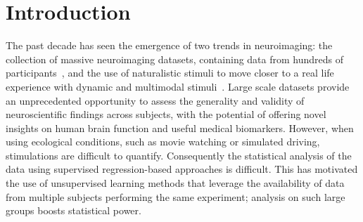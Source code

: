 %
\section{Introduction}
\label{sec:intro}
The past decade has seen the emergence of two trends in neuroimaging: the collection of massive neuroimaging datasets, containing data from hundreds of participants~\cite{taylor2017cambridge,van2013wu,sudlow2015uk}, and the use of naturalistic stimuli to move closer to a real life experience with dynamic and multimodal stimuli~\cite{Sonkusare-etal:2019}.
%
%
Large scale datasets provide an unprecedented opportunity to assess the generality and validity of neuroscientific findings across subjects, with the potential of offering novel insights on human brain function and useful medical biomarkers.
%
%
However, when using ecological conditions, such as movie watching or simulated driving, 
stimulations are difficult to quantify. Consequently the statistical analysis of the data using
supervised regression-based approaches is difficult.
%
This has motivated the use of unsupervised learning methods that leverage the availability of
data from multiple subjects performing the same experiment; analysis on such large groups boosts statistical
power.

